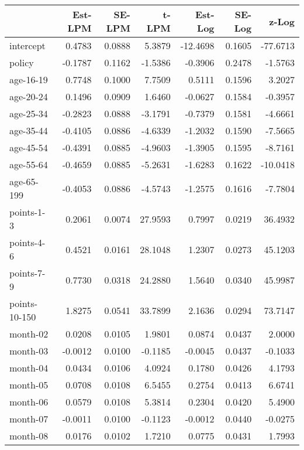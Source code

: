 \documentclass[10pt]{article}
\begin{document}

\begin{table}[ht]
\centering
\begin{tabular}{lrrrrrr}
  \hline
 & Est-LPM & SE-LPM & t-LPM & Est-Log & SE-Log & z-Log \\ 
  \hline
intercept & 0.4783 & 0.0888 & 5.3879 & -12.4698 & 0.1605 & -77.6713 \\ 
  policy & -0.1787 & 0.1162 & -1.5386 & -0.3906 & 0.2478 & -1.5763 \\ 
  age-16-19 & 0.7748 & 0.1000 & 7.7509 & 0.5111 & 0.1596 & 3.2027 \\ 
  age-20-24 & 0.1496 & 0.0909 & 1.6460 & -0.0627 & 0.1584 & -0.3957 \\ 
  age-25-34 & -0.2823 & 0.0888 & -3.1791 & -0.7379 & 0.1581 & -4.6661 \\ 
  age-35-44 & -0.4105 & 0.0886 & -4.6339 & -1.2032 & 0.1590 & -7.5665 \\ 
  age-45-54 & -0.4391 & 0.0885 & -4.9603 & -1.3905 & 0.1595 & -8.7161 \\ 
  age-55-64 & -0.4659 & 0.0885 & -5.2631 & -1.6283 & 0.1622 & -10.0418 \\ 
  age-65-199 & -0.4053 & 0.0886 & -4.5743 & -1.2575 & 0.1616 & -7.7804 \\ 
  points-1-3 & 0.2061 & 0.0074 & 27.9593 & 0.7997 & 0.0219 & 36.4932 \\ 
  points-4-6 & 0.4521 & 0.0161 & 28.1048 & 1.2307 & 0.0273 & 45.1203 \\ 
  points-7-9 & 0.7730 & 0.0318 & 24.2880 & 1.5640 & 0.0340 & 45.9987 \\ 
  points-10-150 & 1.8275 & 0.0541 & 33.7899 & 2.1636 & 0.0294 & 73.7147 \\ 
  month-02 & 0.0208 & 0.0105 & 1.9801 & 0.0874 & 0.0437 & 2.0000 \\ 
  month-03 & -0.0012 & 0.0100 & -0.1185 & -0.0045 & 0.0437 & -0.1033 \\ 
  month-04 & 0.0434 & 0.0106 & 4.0924 & 0.1780 & 0.0426 & 4.1793 \\ 
  month-05 & 0.0708 & 0.0108 & 6.5455 & 0.2754 & 0.0413 & 6.6741 \\ 
  month-06 & 0.0579 & 0.0108 & 5.3814 & 0.2304 & 0.0420 & 5.4900 \\ 
  month-07 & -0.0011 & 0.0100 & -0.1123 & -0.0012 & 0.0440 & -0.0275 \\ 
  month-08 & 0.0176 & 0.0102 & 1.7210 & 0.0775 & 0.0431 & 1.7993 \\ 

\end{tabular}
\end{table}
\end{document}
